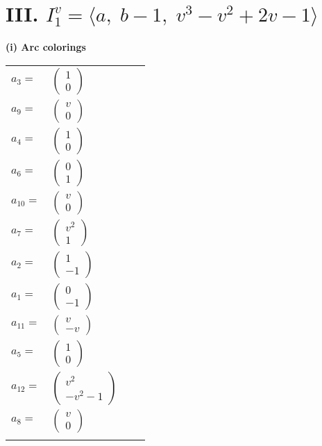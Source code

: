 \documentclass[1p]{elsarticle_modified}
\theoremstyle{definition}
\begin{document}
\centering \section*{III. $I^v_{1}= \langle a,\;b-1,\;v^3- v^2+2 v-1 \rangle$}
\flushleft \textbf{(i) Arc colorings}\\
\begin{tabular}{m{7pt} m{180pt} m{7pt} m{180pt} }
\flushright $a_{3}=$&$\begin{pmatrix}1\\0\end{pmatrix}$ \\
\flushright $a_{9}=$&$\begin{pmatrix}v\\0\end{pmatrix}$ \\
\flushright $a_{4}=$&$\begin{pmatrix}1\\0\end{pmatrix}$ \\
\flushright $a_{6}=$&$\begin{pmatrix}0\\1\end{pmatrix}$ \\
\flushright $a_{10}=$&$\begin{pmatrix}v\\0\end{pmatrix}$ \\
\flushright $a_{7}=$&$\begin{pmatrix}v^2\\1\end{pmatrix}$ \\
\flushright $a_{2}=$&$\begin{pmatrix}1\\-1\end{pmatrix}$ \\
\flushright $a_{1}=$&$\begin{pmatrix}0\\-1\end{pmatrix}$ \\
\flushright $a_{11}=$&$\begin{pmatrix}v\\- v\end{pmatrix}$ \\
\flushright $a_{5}=$&$\begin{pmatrix}1\\0\end{pmatrix}$ \\
\flushright $a_{12}=$&$\begin{pmatrix}v^2\\- v^2-1\end{pmatrix}$ \\
\flushright $a_{8}=$&$\begin{pmatrix}v\\0\end{pmatrix}$\\&\end{tabular}
\end{document}
